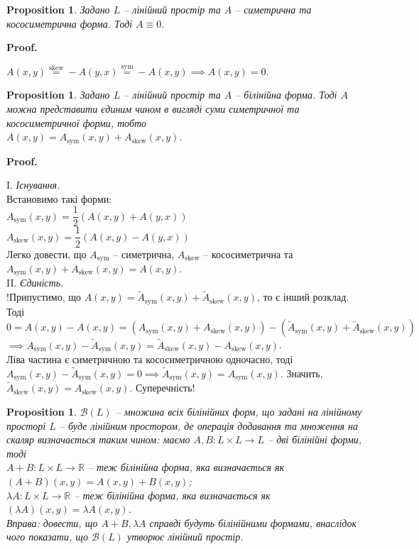 \documentclass[a4paper, 10pt]{article}
\makeatletter
\theoremstyle{theoremdd}
\newtheorem{proposition}[theorem]{Proposition}
\renewenvironment{proof}[1][Proof.\\]{\par
\pushQED{\hfill \qed}%
\normalfont \topsep6\p@\@plus6\p@\relax
\trivlist
\item\relax
{\bfseries
#1\@addpunct{.}}\hspace\labelsep\ignorespaces
}{%
\popQED\endtrivlist\@endpefalse
}
\makeatother
\begin{document}
\begin{proposition}
Задано $L$ -- лінійний простір та $A$ -- симетрична та кососиметрична форма. Тоді $A \equiv 0$.
\end{proposition}

\begin{proof}
$A(x,y) \overset{\text{skew}}{=} -A(y,x) \overset{\text{sym}}{=} -A(x,y) \implies A(x,y) = 0$.
\end{proof}

\begin{proposition}
Задано $L$ -- лінійний простір та $A$ -- білінійна форма. Тоді $A$ можна представити єдиним чином в вигляді суми симетричної та кососиметричної форми, тобто\\
$A(x,y) = A_{\text{sym}}(x,y) + A_{\text{skew}}(x,y)$.
\end{proposition}

\begin{proof}
I. \textit{Існування.}\\
Встановимо такі форми: \\
$A_{\text{sym}}(x,y) = \dfrac{1}{2} \left( A(x,y) + A(y,x) \right)$ \\
$A_{\text{skew}}(x,y) = \dfrac{1}{2} \left( A(x,y) - A(y,x) \right)$ \\
Легко довести, що $A_{\text{sym}}$ -- симетрична, $A_{\text{skew}}$ -- кососиметрична та $A_{\text{sym}}(x,y) + A_{\text{skew}}(x,y) = A(x,y)$.
\bigskip \\
II. \textit{Єдиність.}\\
!Припустимо, що $A(x,y) = \widetilde{A}_{\text{sym}}(x,y) + \widetilde{A}_{\text{skew}}(x,y)$, то є інший розклад. Тоді\\
$0 = A(x,y) - A(x,y) = (A_{\text{sym}}(x,y) + A_{\text{skew}}(x,y)) - (\widetilde{A}_{\text{sym}}(x,y) + \widetilde{A}_{\text{skew}}(x,y))$\\
$\implies A_{\text{sym}}(x,y) - \widetilde{A}_{\text{sym}}(x,y) = \widetilde{A}_{\text{skew}}(x,y) - A_{\text{skew}}(x,y)$.\\
Ліва частина є симетричною та кососиметричною одночасно, тоді $A_{\text{sym}}(x,y) - \widetilde{A}_{\text{sym}}(x,y) = 0 \implies \widetilde{A}_{\text{sym}}(x,y) = A_{\text{sym}}(x,y)$. Значить, $\widetilde{A}_{\text{skew}}(x,y) = A_{\text{skew}}(x,y)$. Суперечність!
\end{proof}
\noindent

\begin{proposition}
$\mathcal{B}(L)$ -- множина всіх білінійних форм, що задані на лінійному просторі $L$ -- буде лінійним простором, де операція додавання та множення на скаляр визначається таким чином: маємо $A,B \colon L \times L \to L$ -- дві білінійні форми, тоді\\
$A+B \colon L \times L \to \mathbb{R}$ -- теж білінійна форма, яка визначається як $(A+B)(x,y) = A(x,y) + B(x,y)$;\\
$\lambda A \colon L \times L \to \mathbb{R}$ -- теж білінійна форма, яка визначається як $(\lambda A)(x,y) = \lambda A(x,y)$.\\
\textit{Вправа: довести, що $A+B, \lambda A$ справді будуть білінійними формами, внаслідок чого показати, що $\mathcal{B}(L)$ утворює лінійний простір.}
\end{proposition}
\end{document}
